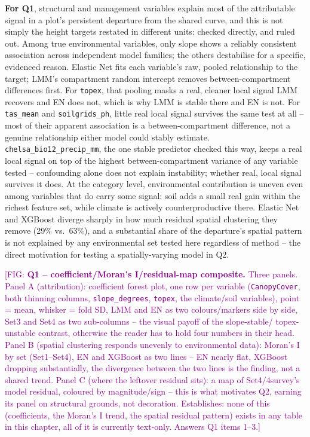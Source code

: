 \documentclass[logo,msc,ai]{infthesis}           %
\newcommand{\fig}[1]{\textcolor{purple}{[FIG: #1]}}
\begin{document}
\textbf{For Q1}, structural and management variables explain most of
the attributable signal in a plot's persistent departure from the shared curve, and
this is not simply the height targets restated in different units: checked directly,
and ruled out. Among true environmental variables, only slope shows a reliably
consistent association across independent model families; the others destabilise for
a specific, evidenced reason. Elastic Net fits each variable's raw, pooled
relationship to the target; LMM's compartment random intercept removes
between-compartment differences first. For \texttt{topex}, that pooling masks a
real, cleaner local signal LMM recovers and EN does not, which is why LMM is stable
there and EN is not. For \texttt{tas\_mean} and \texttt{soilgrids\_ph}, little real
local signal survives the same test at all -- most of their apparent association is
a between-compartment difference, not a genuine relationship either model could
stably estimate. \texttt{chelsa\_bio12\_precip\_mm}, the one stable predictor
checked this way, keeps a real local signal on top of the highest between-compartment
variance of any variable tested -- confounding alone does not explain instability;
whether real, local signal survives it does.
At the category level, environmental contribution is uneven even among variables
that do carry some signal: soil adds a small real gain within the richest feature
set, while climate is actively counterproductive there. Elastic Net and XGBoost
diverge sharply in how much residual spatial clustering they remove (29\% vs.\ 63\%),
and a substantial share of the departure's spatial pattern is not explained by any
environmental set tested here regardless of method -- the direct motivation for
testing a spatially-varying model in Q2.

\fig{\textbf{Q1 -- coefficient/Moran's I/residual-map composite.} Three panels.
Panel A (attribution): coefficient forest plot, one row per variable (\texttt{CanopyCover},
both thinning columns, \texttt{slope\_degrees}, \texttt{topex}, the climate/soil
variables), point = mean, whisker = fold SD, LMM and EN as two colours/markers side by
side, Set3 and Set4 as two sub-columns -- the visual payoff of the slope-stable/
topex-unstable contrast, otherwise the reader has to hold four numbers in their head.
Panel B (spatial clustering responds unevenly to environmental data): Moran's I by set
(Set1--Set4), EN and XGBoost as two lines -- EN nearly flat, XGBoost dropping
substantially, the divergence between the two lines is the finding, not a shared trend.
Panel C (where the leftover residual sits): a map of Set4/4survey's model residual,
coloured by magnitude/sign -- this is what motivates Q2, earning its panel on
structural grounds, not decoration. Establishes: none of this (coefficients, the
Moran's I trend, the spatial residual pattern) exists in any table in this chapter, all
of it is currently text-only. Answers Q1 items 1--3.}
\end{document}
